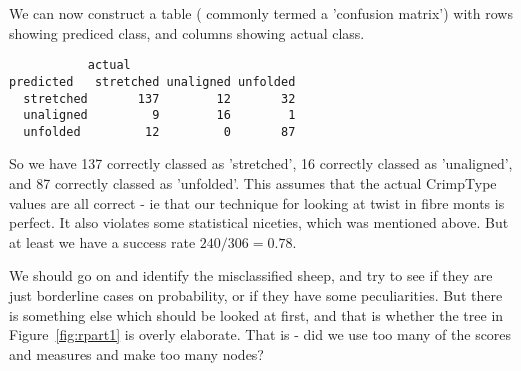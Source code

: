 \documentclass[titlepage]{article}  %
\begin{document}
We can now construct a table ( commonly termed a 'confusion matrix') with rows showing prediced class, and columns showing actual class.
\begin{verbatim}
           actual
predicted   stretched unaligned unfolded
  stretched       137        12       32
  unaligned         9        16        1
  unfolded         12         0       87
\end{verbatim}
 So we have 137 correctly classed as 'stretched', 16 correctly classed as 'unaligned', and 87 correctly classed as 'unfolded'. This assumes that the actual CrimpType values are all correct - ie that our technique for looking at twist in fibre monts is perfect. It also violates some statistical niceties, which was mentioned above. But at least we have a success rate $240/306=0.78$. 

We should go on and identify the misclassified sheep, and try to see if they are just borderline cases on probability, or if they have some peculiarities. But there is something else which should be looked at first, and that is whether the tree in Figure~\ref{fig:rpart1} is overly elaborate. That is - did we use too many of the scores and measures and make too many nodes? 
\end{document}

